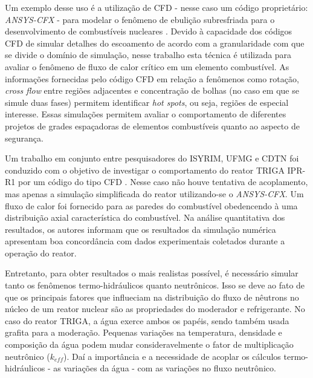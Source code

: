 Um exemplo desse uso é a utilização de CFD - nesse caso um código proprietário: 
\textit{ANSYS-CFX} - para modelar o fenômeno de ebulição subresfriada para o 
desenvolvimento de combustíveis nucleares \cite{Krepper2007}. Devido à capacidade 
dos códigos CFD de simular detalhes do escoamento de acordo com a granularidade com que se
divide o domínio de simulação, nesse trabalho esta técnica é utilizada para avaliar 
o fenômeno de fluxo de calor crítico em um elemento combustível. As informações 
fornecidas pelo código CFD em relação a fenômenos como rotação, \textit{cross flow} entre 
regiões adjacentes e concentração de bolhas (no caso em que se simule duas fases)
permitem identificar \textit{hot spots}, ou seja, regiões de especial interesse.
Essas simulações permitem avaliar o comportamento
de diferentes projetos de grades espaçadoras de elementos combustíveis quanto ao aspecto 
de segurança.

Um trabalho em conjunto entre pesquisadores do ISYRIM, UFMG e CDTN foi conduzido
com o objetivo de investigar o comportamento do reator TRIGA IPR-R1 por um código do tipo CFD \cite{Martinez2012}. 
Nesse caso não houve tentativa de acoplamento, mas apenas a simulação simplificada 
do reator utilizando-se o \textit{ANSYS-CFX}. Um fluxo de calor 
foi fornecido para as paredes do combustível obedencendo à uma distribuição axial 
característica do combustível. Na análise quantitativa dos resultados, os autores 
informam que os resultados da simulação numérica apresentam boa concordância com 
dados experimentais coletados durante a operação do reator.


Entretanto, para obter resultados o mais realistas possível, é necessário simular 
tanto os fenômenos termo-hidráulicos quanto neutrônicos. Isso 
se deve ao fato de que os principais fatores que influeciam na distribuição do fluxo de 
nêutrons no núcleo de um reator nuclear são as propriedades do moderador e refrigerante. No caso do 
reator TRIGA, a água exerce ambos os papéis, sendo também usada grafita para 
a moderação. Pequenas variações na temperatura, densidade e composição 
da água podem mudar consideravelmente o fator de multiplicação neutrônico ($k_{eff}$). Daí a importância e 
a necessidade de acoplar os cálculos termo-hidráulicos - as variações da água - com as variações 
no fluxo neutrônico.


